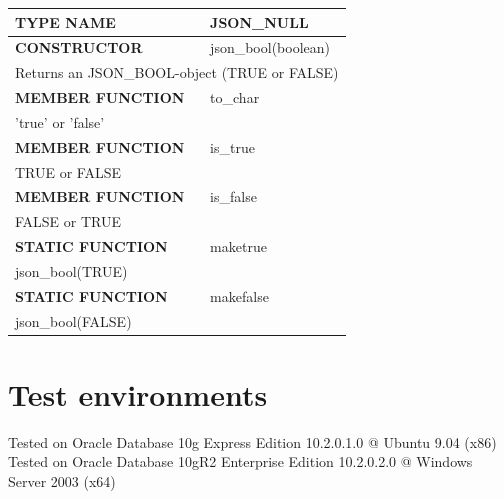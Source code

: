 \documentclass[11pt,twocolumn, a4paper]{article}
\begin{document}
\begin{longtable}{| l | l |}

\hline
  \rowcolor{gray}\color{white}
  \textbf{TYPE NAME} & \color{white}\textbf{JSON\_NULL} \\
\hline

\hline
  \textbf{CONSTRUCTOR} & json\_bool(boolean)\\
\hline
  \multicolumn{2}{|p{15cm}|}{Returns an JSON\_BOOL-object (TRUE or FALSE)} \\
\hline

\hline
  \textbf{MEMBER FUNCTION} & to\_char \\
\hline
  \multicolumn{2}{|p{15cm}|}{'true' or 'false'} \\
\hline

\hline
  \textbf{MEMBER FUNCTION} & is\_true \\
\hline
  \multicolumn{2}{|p{15cm}|}{TRUE or FALSE} \\
\hline

\hline
  \textbf{MEMBER FUNCTION} & is\_false \\
\hline
  \multicolumn{2}{|p{15cm}|}{FALSE or TRUE} \\
\hline

\hline
  \textbf{STATIC FUNCTION} & maketrue \\
\hline
  \multicolumn{2}{|p{15cm}|}{json\_bool(TRUE)} \\
\hline

\hline
  \textbf{STATIC FUNCTION} & makefalse \\
\hline
  \multicolumn{2}{|p{15cm}|}{json\_bool(FALSE)} \\
\hline

\end{longtable}

\section*{Test environments}
Tested on Oracle Database 10g Express Edition 10.2.0.1.0 @ Ubuntu 9.04 (x86)\\
Tested on Oracle Database 10gR2 Enterprise Edition 10.2.0.2.0 @ Windows Server 2003 (x64)
\end{document}
